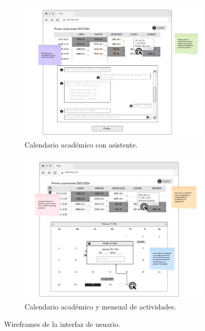 \begin{figure}[H]
    \centering
    \begin{subfigure}[b]{0.45\textwidth}
        \centering
        \includegraphics[width=\textwidth]{./imagenes/Mockup_calendario.png}
        \caption{Calendario académico con asistente.}
    \end{subfigure}
    \hfill
    \begin{subfigure}[b]{0.45\textwidth}
        \centering
        \includegraphics[width=\textwidth]{./imagenes/Mockup_organizador.png}
        \caption{Calendario académico y mensual de actividades.}
    \end{subfigure}
    \caption{Wireframes de la interfaz de usuario.}
\end{figure}

